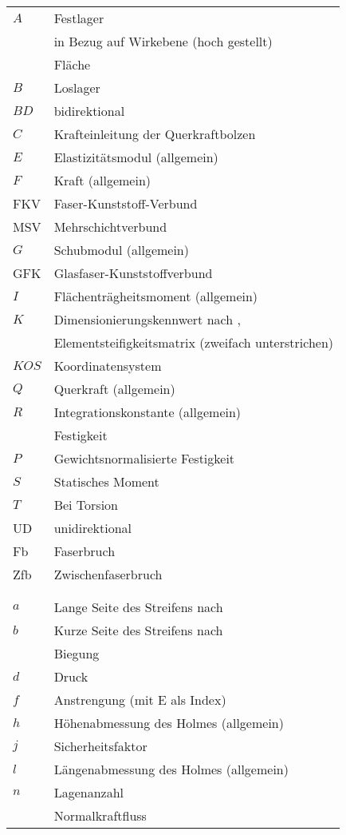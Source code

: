 \begin{longtable}{ll}
\onehalfspacing
$ A $&Festlager\\
&in Bezug auf Wirkebene (hoch gestellt)\\
&Fläche\\
$ B $&Loslager\\
$ BD $& bidirektional\\
$ C $&Krafteinleitung der Querkraftbolzen\\
$ E $&Elastizitätsmodul (allgemein)\\
$ F $&Kraft (allgemein)\\
FKV&Faser-Kunststoff-Verbund\\
MSV&Mehrschichtverbund\\
$ G $&Schubmodul (allgemein)\\
GFK& Glasfaser-Kunststoffverbund\\
$ I $&Flächenträgheitsmoment (allgemein)\\
$ K $&Dimensionierungskennwert nach \cite{item5},\\
 &Elementsteifigkeitsmatrix (zweifach unterstrichen)\\
 $ KOS$& Koordinatensystem\\
$ Q $&Querkraft (allgemein)\\
$ R $&Integrationskonstante (allgemein)\\
&Festigkeit\\
$ P $&Gewichtsnormalisierte Festigkeit\\
$ S $&Statisches Moment\\
$ T $&Bei Torsion\\
UD&unidirektional\\
Fb&Faserbruch\\
Zfb&Zwischenfaserbruch\\
& \\
& \\
$ a $&Lange Seite des Streifens nach \cite{item1}\\
$ b $&Kurze Seite des Streifens nach \cite{item1}\\
&Biegung\\
$ d$& Druck\\
$ f $&Anstrengung (mit E als Index)\\
$ h $&Höhenabmessung des Holmes (allgemein)\\
$ j $&Sicherheitsfaktor\\
$ l $&Längenabmessung des Holmes (allgemein)\\
$ n $&Lagenanzahl\\
&Normalkraftfluss\\

\end{longtable}
